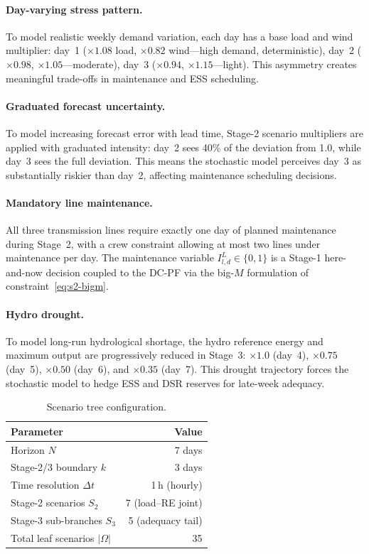 \documentclass[11pt]{article}
\begin{document}
\paragraph{Day-varying stress pattern.}
To model realistic weekly demand variation, each day has a base load
and wind multiplier:
day~1 ($\times 1.08$ load, $\times 0.82$ wind---high demand,
deterministic), day~2 ($\times 0.98$, $\times 1.05$---moderate),
day~3 ($\times 0.94$, $\times 1.15$---light). This asymmetry
creates meaningful trade-offs in maintenance and ESS scheduling.

\paragraph{Graduated forecast uncertainty.}
To model increasing forecast error with lead time, Stage-2 scenario
multipliers are applied with graduated intensity: day~2 sees 40\%
of the deviation from 1.0, while day~3 sees the full deviation.
This means the stochastic model perceives day~3 as substantially
riskier than day~2, affecting maintenance scheduling decisions.

\paragraph{Mandatory line maintenance.}
All three transmission lines require exactly one day of planned
maintenance during Stage~2, with a crew constraint allowing at most
two lines under maintenance per day. The maintenance variable
$I^L_{l,d} \in \{0,1\}$ is a Stage-1 here-and-now decision coupled
to the DC-PF via the big-$M$ formulation of constraint~\eqref{eq:s2-bigm}.

\paragraph{Hydro drought.}
To model long-run hydrological shortage, the hydro reference energy
and maximum output are progressively reduced in Stage~3:
$\times 1.0$ (day~4), $\times 0.75$ (day~5), $\times 0.50$ (day~6),
and $\times 0.35$ (day~7). This drought trajectory forces the
stochastic model to hedge ESS and DSR reserves for late-week adequacy.

\begin{table}[H]
\centering
\caption{Scenario tree configuration.}
\label{tab:scenario-config}
\small
\begin{tabular}{lr}
\toprule
\textbf{Parameter} & \textbf{Value} \\
\midrule
Horizon $N$ & 7 days \\
Stage-2/3 boundary $k$ & 3 days \\
Time resolution $\Delta t$ & 1\,h (hourly) \\
Stage-2 scenarios $S_2$ & 7 (load--RE joint) \\
Stage-3 sub-branches $S_3$ & 5 (adequacy tail) \\
Total leaf scenarios $|\Omega|$ & 35 \\
\bottomrule
\end{tabular}
\end{table}
\end{document}
